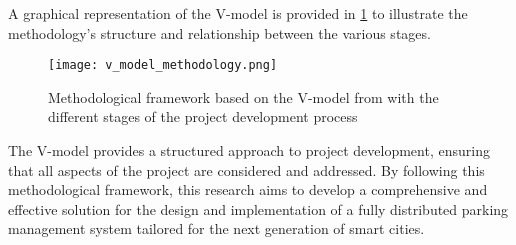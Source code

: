 A graphical representation of the V-model is provided in \cref{fig:v_model_methodology} to illustrate the methodology's structure and relationship between the various stages.

\begin{figure}
	\texttt{[image: v\_model\_methodology.png]}
	\caption{Methodological framework based on the V-model from  with the different stages of the project development process}\label{fig:v_model_methodology}
\end{figure}

The V-model provides a structured approach to project development, ensuring that all aspects of the project are considered and addressed. By following this methodological framework, this research aims to develop a comprehensive and effective solution for the design and implementation of a fully distributed parking management system tailored for the next generation of smart cities.

